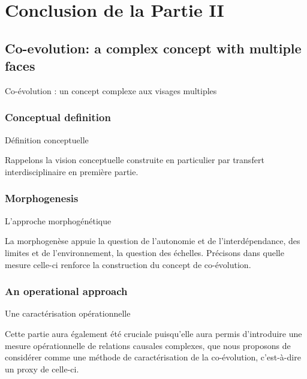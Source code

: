 



\chapter*{Conclusion de la Partie II}








\section*{Co-evolution: a complex concept with multiple faces}{Co-évolution : un concept complexe aux visages multiples}



\subsection*{Conceptual definition}{Définition conceptuelle}


Rappelons la vision conceptuelle construite en particulier par transfert interdisciplinaire en première partie.



\subsection*{Morphogenesis}{L'approche morphogénétique}


La morphogenèse appuie la question de l'autonomie et de l'interdépendance, des limites et de l'environnement, la question des échelles. Précisons dans quelle mesure celle-ci renforce la construction du concept de co-évolution.





\subsection*{An operational approach}{Une caractérisation opérationnelle}


Cette partie aura également été cruciale puisqu'elle aura permis d'introduire une mesure opérationnelle de relations causales complexes, que nous proposons de considérer comme une méthode de caractérisation de la co-évolution, c'est-à-dire un proxy de celle-ci.





